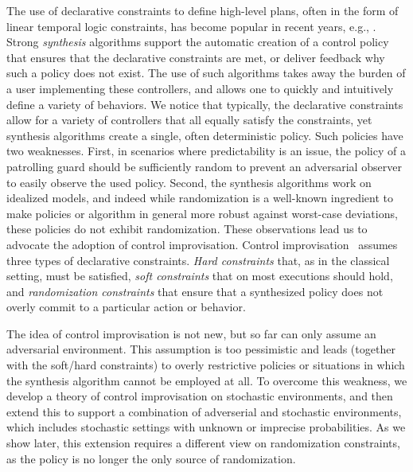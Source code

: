 The use of declarative constraints to define high-level plans, often in the form of linear temporal logic constraints, has become popular in recent years, e.g., \cite{DBLP:conf/iros/HorowitzWM14,DBLP:conf/rss/WongEK14,DBLP:conf/iros/HeLKV17,DBLP:conf/icra/FuATP16,DBLP:conf/icra/HeWKV19,DBLP:journals/arobots/MoarrefK20,DBLP:conf/icra/KantarosM0P20}. 
Strong \emph{synthesis} algorithms support the automatic creation of a control policy that ensures that the declarative constraints are met, or deliver feedback why such a policy does not exist. 
The use of such algorithms takes away the burden of a user implementing these controllers, and allows one to quickly and intuitively define a variety of behaviors.
We notice that typically, the declarative constraints allow for a variety of controllers that all equally satisfy the constraints, yet synthesis algorithms create a single, often deterministic policy. 
Such policies have two weaknesses. First, in scenarios where predictability is an issue, the policy of a patrolling guard should be sufficiently random to prevent an adversarial observer to easily observe the used policy. 
Second, the synthesis algorithms work on idealized models, and indeed  while randomization is a well-known ingredient to make policies or algorithm in general more robust against worst-case deviations, these policies do not exhibit randomization.  
These observations lead us to advocate the adoption of control improvisation. 
Control improvisation~\cite{} assumes three types of declarative constraints. \emph{Hard constraints} that, as in the classical setting, must be satisfied, \emph{soft constraints} that on most executions should hold,
and \emph{randomization constraints} that ensure that a synthesized policy does not overly commit to a particular action or behavior. 

The idea of control improvisation is not new, but so far can only assume an adversarial environment. This assumption is too pessimistic and leads (together with the soft/hard constraints) to overly restrictive policies or situations in which the synthesis algorithm cannot be employed at all. 
To overcome this weakness, we develop a theory of control improvisation on stochastic environments, and then extend this to support a combination of adverserial and stochastic environments, which includes stochastic settings with unknown or imprecise probabilities.
As we show later, this extension requires a different view on randomization constraints, as the policy is no longer the only source of randomization. 



